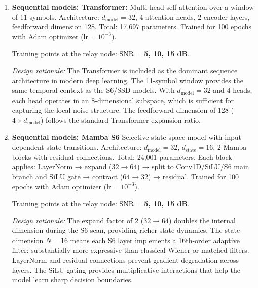 \begin{enumerate}
  Training points at the relay node: SNR = \textbf{5, 10, 15 dB}.

  \emph{Design rationale:} The high \(\lambda_{\text{L1}} = 100\) ensures that the generator is primarily supervised by the reconstruction loss, with the adversarial term acting as a regularizer that encourages outputs to lie on the clean signal manifold. The noise vector \(\mathbf{z} \in \mathbb{R}^8\) provides the stochastic input needed by the GAN framework. The 5:1 critic-to-generator update ratio follows the WGAN-GP recommendation for stable critic training. The doubled epoch count (200 vs.~100) compensates for the slower per-step convergence of adversarial training.

\item  \textbf{Sequential models: Transformer:} Multi-head self-attention over a window of 11 symbols. Architecture: \(d_{\text{model}}=32\), 4 attention heads, 2 encoder layers, feedforward dimension 128. Total: 17,697 parameters. Trained for 100 epochs with Adam optimizer (\(\text{lr}=10^{-3}\)).

  Training points at the relay node: SNR = \textbf{5, 10, 15 dB}.

  \emph{Design rationale:} The Transformer is included as the dominant sequence architecture in modern deep learning. The 11-symbol window provides the same temporal context as the S6/SSD models. With \(d_{\text{model}} = 32\) and 4 heads, each head operates in an 8-dimensional subspace, which is sufficient for capturing the local noise structure. The feedforward dimension of 128 (\(4 \times d_{\text{model}}\)) follows the standard Transformer expansion ratio.
\item  \textbf{Sequential models: Mamba S6} Selective state space model with input-dependent state transitions. Architecture: \(d_{\text{model}}=32\), \(d_{\text{state}}=16\), 2 Mamba blocks with residual connections. Total: 24,001 parameters. Each block applies: LayerNorm → expand (\(32 \to 64\)) → split to Conv1D/SiLU/S6 main branch and SiLU gate → contract (\(64 \to 32\)) → residual. Trained for 100 epochs with Adam optimizer (\(\text{lr}=10^{-3}\)).

  Training points at the relay node: SNR = \textbf{5, 10, 15 dB}.

  \emph{Design rationale:} The expand factor of 2 (\(32 \to 64\)) doubles the internal dimension during the S6 scan, providing richer state dynamics. The state dimension \(N = 16\) means each S6 layer implements a 16th-order adaptive filter: substantially more expressive than classical Wiener or matched filters. LayerNorm and residual connections prevent gradient degradation across layers. The SiLU gating provides multiplicative interactions that help the model learn sharp decision boundaries.


\end{enumerate}
